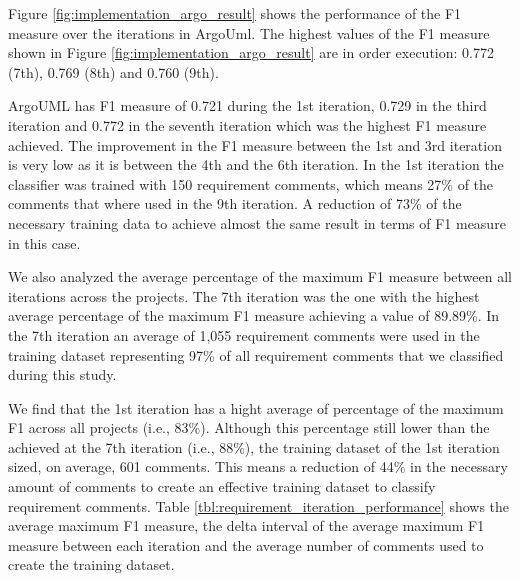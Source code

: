 Figure \ref{fig:implementation_argo_result} shows the performance of the F1 measure over the iterations in ArgoUml. The highest values of the F1 measure shown in Figure \ref{fig:implementation_argo_result} are in order execution: 0.772 (7th), 0.769 (8th) and 0.760 (9th).

ArgoUML has F1 measure of 0.721 during the 1st iteration, 0.729 in the third iteration and 0.772 in the seventh iteration which was the highest F1 measure achieved. The improvement in the F1 measure between the 1st and 3rd iteration is very low as it is between the 4th and the 6th iteration. In the 1st iteration the classifier was trained with 150 requirement \SATD comments, which means 27\% of the comments that where used in the 9th iteration. A reduction of 73\% of the necessary training data to achieve almost the same result in terms of F1 measure in this case. 

We also analyzed the average percentage of the maximum F1 measure between all iterations across the projects. The 7th iteration was the one with the highest average percentage of the maximum F1 measure achieving a value of 89.89\%. In the 7th iteration an average of 1,055 requirement \SATD comments were used in the training dataset representing 97\% of all requirement \SATD comments that we classified during this study.

We find that the 1st iteration has a hight average of percentage of the maximum F1 across all projects (i.e., 83\%). Although this percentage still lower than the achieved at the 7th iteration (i.e., 88\%), the training dataset of the 1st iteration sized, on average, 601 \SATD comments. This means a reduction of 44\% in the necessary amount of comments to create an effective training dataset to classify requirement \SATD comments. Table \ref{tbl:requirement_iteration_performance} shows the average maximum F1 measure, the delta interval of the average maximum F1 measure between each iteration and the average number of comments used to create the training dataset. 

